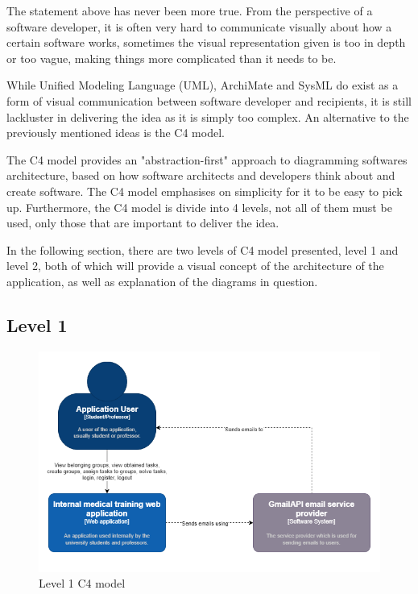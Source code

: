 \documentclass[singlespacing,12pt,parskip,headsepline,consistentlayout]{article}
\begin{document}
The statement above has never been more true. From the perspective of a software developer, it is often very hard to communicate visually about how a certain software works, sometimes the visual representation given is too in depth or too vague, making things more complicated than it needs to be.

While Unified Modeling Language (UML), ArchiMate and SysML do exist \cite{c4modelDocs} as a form of visual communication between software developer and recipients, it is still lackluster in delivering the idea as it is simply too complex. An alternative to the previously mentioned ideas is the C4 model.

The C4 model provides an "abstraction-first" approach to diagramming softwares architecture, based on how software architects and developers think about and create software. The C4 model emphasises on simplicity for it to be easy to pick up. Furthermore, the C4 model is divide into 4 levels, not all of them must be used, only those that are important to deliver the idea. \cite{c4modelDocs}

In the following section, there are two levels of C4 model presented, level 1 and level 2, both of which will provide a visual concept of the architecture of the application, as well as explanation of the diagrams in question.

\subsection{Level 1}

\begin{figure}[H]
    \centering
    \includegraphics[width=\textwidth,height=\textheight,keepaspectratio]{img/c4_level1.png}
    \caption{Level 1 C4 model}
\end{figure}
\end{document}

